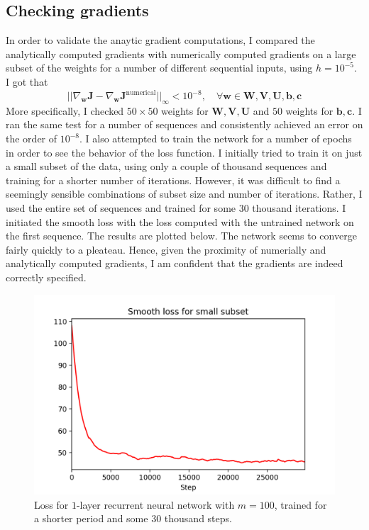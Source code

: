 \documentclass{article}
\begin{document}
\newpage

\subsection*{Checking gradients}

	In order to validate the anaytic gradient computations, I compared the analytically computed gradients with numerically computed gradients on a large subset of the weights for a number of different sequential inputs, using $h = 10^{-5}$.  I got that
	$$\vert\vert \nabla_{\bm{w}} \bm{J}- \nabla_{\bm{w}} \bm{J}^{\text{numerical}} \vert\vert_{\infty} < 10^{-8}, \quad \forall\bm{w} \in \bm{W}, \bm{V}, \bm{U}, \bm{b} ,\bm{c}$$
	More specifically, I checked $50\times50$ weights for $\bm{W}, \bm{V}, \bm{U}$ and $50$ weights for $\bm{b} ,\bm{c}$. I ran the same test for a number of sequences and consistently achieved an error on the order of $10^{-8}$. I also attempted to train the network for a number of epochs in order to see the behavior of the loss function. I initially tried to train it on just a small subset of the data, using only a couple of thousand sequences and training for a shorter number of iterations. However, it was difficult to find a seemingly sensible combinations of subset size and number of iterations. Rather, I used the entire set of sequences and trained for some $30$ thousand iterations. I initiated the smooth loss with the loss computed with the untrained network on the first sequence. The results are plotted below. The network seems to converge fairly quickly to a pleateau. Hence, given the proximity of numerially and analytically computed gradients, I am confident that the gradients are indeed correctly specified.
	\begin{figure}[h!]
		\centering
		\includegraphics[width=12cm]{../plots/grad_test_rnn.png}
		\caption{Loss for $1$-layer recurrent neural network with $m=100$, trained for a shorter period and some $30$ thousand steps.}
 	\end{figure}
\end{document}
